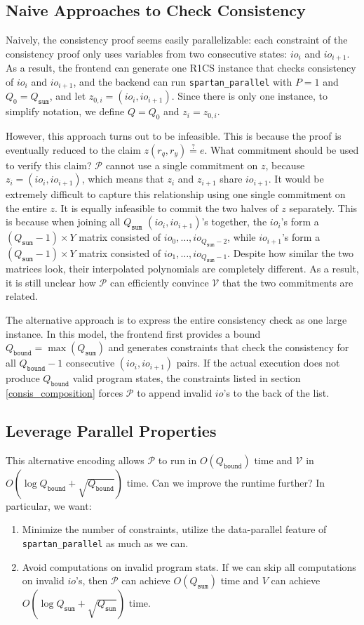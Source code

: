\documentclass{article}
\newcommand{\code}{\texttt}
\newcommand{\Qbound}{Q_{\mathtt{bound}}}
\newcommand{\Qsum}{Q_{\mathtt{sum}}}
\renewcommand{\P}{\mathcal{P}}
\newcommand{\V}{\mathcal{V}}
\newcommand{\eqq}{\stackrel{?}{=}}
\begin{document}
\subsection{Naive Approaches to Check Consistency}

Naively, the consistency proof seems easily parallelizable: each constraint of the consistency proof only uses variables from two consecutive states: $io_i$ and $io_{i + 1}$. As a result, the frontend can generate one R1CS instance that checks consistency of $io_i$ and $io_{i + 1}$, and the backend can run \code{spartan\_parallel} with $P = 1$ and $Q_0 = \Qsum$, and let $z_{0, i} = (io_i, io_{i + 1})$. Since there is only one instance, to simplify notation, we define $Q = Q_0$ and $z_i = z_{0, i}$.

However, this approach turns out to be infeasible. This is because the proof is eventually reduced to the claim $z(r_q, r_y) \eqq e$. What commitment should be used to verify this claim? $\P$ cannot use a single commitment on $z$, because $z_{i} = (io_i, io_{i + 1})$, which means that $z_i$ and $z_{i+1}$ share $io_{i + 1}$. It would be extremely difficult to capture this relationship using one single commitment on the entire $z$. It is equally infeasible to commit the two halves of $z$ separately. This is because when joining all $\Qsum$ $(io_i, io_{i + 1})$'s together, the $io_i$'s form a $(\Qsum - 1)\times Y$ matrix consisted of $io_0, \dots, io_{\Qsum - 2}$, while $io_{i + 1}$'s form a $(\Qsum - 1)\times Y$ matrix consisted of $io_1, \dots, io_{\Qsum - 1}$. Despite how similar the two matrices look, their interpolated polynomials are completely different. As a result, it is still unclear how $\P$ can efficiently convince $\V$ that the two commitments are related.
 
The alternative approach is to express the entire consistency check as one large instance. In this model, the frontend first provides a bound $\Qbound = \max(\Qsum)$ and generates constraints that check the consistency for all $\Qbound - 1$ consecutive $(io_i, io_{i + 1})$ pairs. If the actual execution does not produce $\Qbound$ valid program states, the constraints listed in section \ref{consis_composition} forces $\P$ to append invalid $io$'s to the back of the list.

\subsection{Leverage Parallel Properties}

This alternative encoding allows $\P$ to run in $O(\Qbound)$ time and $\V$ in $O(\log \Qbound + \sqrt{\Qbound})$ time. Can we improve the runtime further? In particular, we want:
\begin{enumerate}
    \item \label{impr:min_cons} Minimize the number of constraints, utilize the data-parallel feature of \code{spartan\_parallel} as much as we can.
    \item \label{impr:min_comp} Avoid computations on invalid program stats. If we can skip all computations on invalid $io$'s, then $\P$ can achieve $O(\Qsum)$ time and $V$ can achieve $O(\log\Qsum + \sqrt{\Qsum})$ time.
\end{enumerate}
\end{document}

